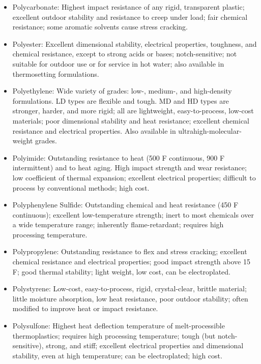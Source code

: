 \documentclass[a4paper,openany,12pt]{book}
\begin{document}
\begin{enumerate}
\begin{itemize}
\item Polycarbonate: Highest impact resistance of any rigid, transparent
plastic; excellent outdoor stability and resistance to creep under
load; fair chemical resistance; some aromatic solvents cause stress
cracking.

\item Polyester: Excellent dimensional stability, electrical properties,
toughness, and chemical resistance, except to strong acids or bases;
notch-sensitive; not suitable for outdoor use or for service in hot
water; also available in thermosetting formulations.

\item Polyethylene: Wide variety of grades: low-, medium-, and high-density
formulations. LD types are flexible and tough. MD and HD types are
stronger, harder, and more rigid; all are lightweight,
easy-to-process, low-cost materials; poor dimensional stability and
heat resistance; excellent chemical resistance and electrical
properties. Also available in ultrahigh-molecular-weight grades.

\item Polyimide: Outstanding resistance to heat (500 F continuous, 900 F
intermittent) and to heat aging. High impact strength and wear
resistance; low coefficient of thermal expansion; excellent electrical
properties; difficult to process by conventional methods; high cost.

\item Polyphenylene Sulfide: Outstanding chemical and heat resistance (450 F
continuous); excellent low-temperature strength; inert to most
chemicals over a wide temperature range; inherently flame-retardant;
requires high processing temperature.

\item Polypropylene: Outstanding resistance to flex and stress cracking;
excellent chemical resistance and electrical properties; good impact
strength above 15 F; good thermal stability; light weight, low cost,
can be electroplated.

\item Polystyrene: Low-cost, easy-to-process, rigid, crystal-clear, brittle
material; little moisture absorption, low heat resistance, poor
outdoor stability; often modified to improve heat or impact
resistance.

\item Polysulfone: Highest heat deflection temperature of melt-processible
thermoplastics; requires high processing temperature; tough (but
notch-sensitive), strong, and stiff; excellent electrical properties
and dimensional stability, even at high temperature; can be
electroplated; high cost.


\end{itemize}
\end{enumerate}
\end{document}
